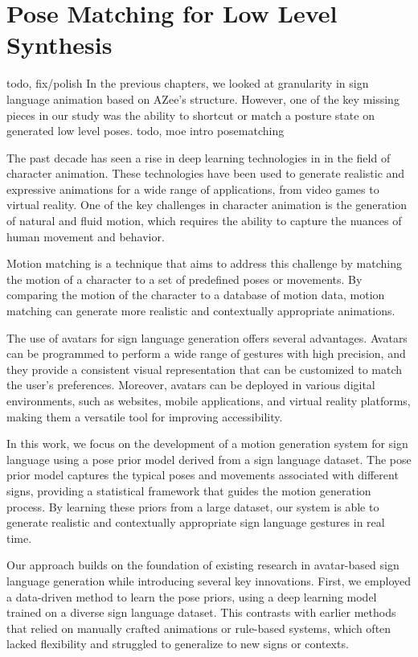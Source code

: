 \documentclass[../../main.tex]{subfiles}
\begin{document}
\chapter{Pose Matching for Low Level Synthesis}
\label{ch:pose_matching}


todo, fix/polish
In the previous chapters, we looked at granularity in sign language animation based on AZee's structure. However, one of the key missing pieces in our study was the ability to shortcut or match a posture state on generated low level poses. todo, moe intro posematching

The past decade has seen a rise in deep learning technologies in in the field of character animation. These technologies have been used to generate realistic and expressive animations for a wide range of applications, from video games to virtual reality. One of the key challenges in character animation is the generation of natural and fluid motion, which requires the ability to capture the nuances of human movement and behavior. 

Motion matching is a technique that aims to address this challenge by matching the motion of a character to a set of predefined poses or movements. By comparing the motion of the character to a database of motion data, motion matching can generate more realistic and contextually appropriate animations.

The use of avatars for sign language generation offers several advantages. Avatars can be programmed to perform a wide range of gestures with high precision, and they provide a consistent visual representation that can be customized to match the user's preferences. Moreover, avatars can be deployed in various digital environments, such as websites, mobile applications, and virtual reality platforms, making them a versatile tool for improving accessibility.

In this work, we focus on the development of a motion generation system for sign language using a pose prior model derived from a sign language dataset. The pose prior model captures the typical poses and movements associated with different signs, providing a statistical framework that guides the motion generation process. By learning these priors from a large dataset, our system is able to generate realistic and contextually appropriate sign language gestures in real time.

Our approach builds on the foundation of existing research in avatar-based sign language generation while introducing several key innovations. First, we employed a data-driven method to learn the pose priors, using a deep learning model trained on a diverse sign language dataset. This contrasts with earlier methods that relied on manually crafted animations or rule-based systems, which often lacked flexibility and struggled to generalize to new signs or contexts.
\end{document}
